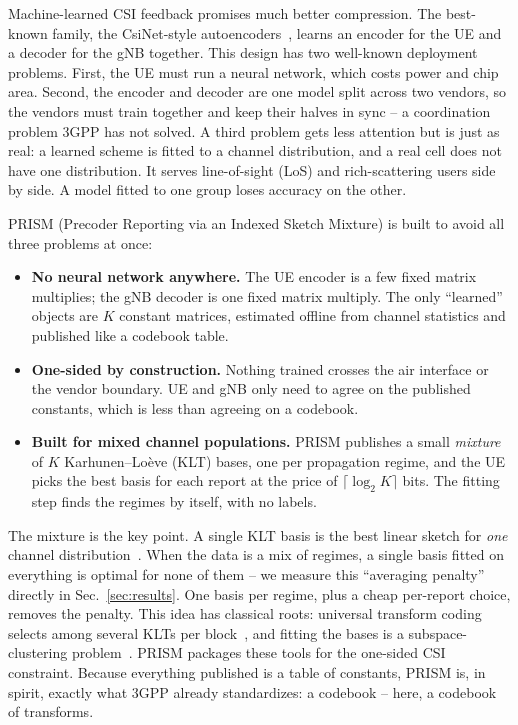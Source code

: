 \documentclass[conference]{IEEEtran}
\begin{document}
Machine-learned CSI feedback promises much better compression. The best-known family, the CsiNet-style autoencoders~\cite{wen2018csinet,guo2022overview}, learns an encoder for the UE and a decoder for the gNB together. This design has two well-known deployment problems. First, the UE must run a neural network, which costs power and chip area. Second, the encoder and decoder are one model split across two vendors, so the vendors must train together and keep their halves in sync -- a coordination problem 3GPP has not solved. A third problem gets less attention but is just as real: a learned scheme is fitted to a channel distribution, and a real cell does not have one distribution. It serves line-of-sight (LoS) and rich-scattering users side by side. A model fitted to one group loses accuracy on the other.

PRISM (Precoder Reporting via an Indexed Sketch Mixture) is built to avoid all three problems at once:
\begin{itemize}
\item \textbf{No neural network anywhere.} The UE encoder is a few fixed matrix multiplies; the gNB decoder is one fixed matrix multiply. The only ``learned'' objects are $K$ constant matrices, estimated offline from channel statistics and published like a codebook table.
\item \textbf{One-sided by construction.} Nothing trained crosses the air interface or the vendor boundary. UE and gNB only need to agree on the published constants, which is less than agreeing on a codebook.
\item \textbf{Built for mixed channel populations.} PRISM publishes a small \emph{mixture} of $K$ Karhunen--Lo\`{e}ve (KLT) bases, one per propagation regime, and the UE picks the best basis for each report at the price of $\lceil\log_2 K\rceil$ bits. The fitting step finds the regimes by itself, with no labels.
\end{itemize}
The mixture is the key point. A single KLT basis is the best linear sketch for \emph{one} channel distribution~\cite{eckartyoung1936}. When the data is a mix of regimes, a single basis fitted on everything is optimal for none of them -- we measure this ``averaging penalty'' directly in Sec.~\ref{sec:results}. One basis per regime, plus a cheap per-report choice, removes the penalty. This idea has classical roots: universal transform coding selects among several KLTs per block~\cite{effros1995wutc}, and fitting the bases is a subspace-clustering problem~\cite{tipping1999mppca,vidal2011subspace}. PRISM packages these tools for the one-sided CSI constraint. Because everything published is a table of constants, PRISM is, in spirit, exactly what 3GPP already standardizes: a codebook -- here, a codebook of transforms.
\end{document}
